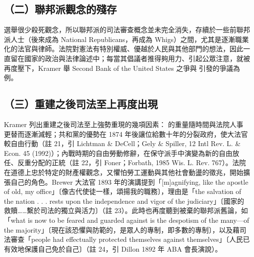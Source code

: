 \subsection{（二）聯邦派觀念的殘存}

選舉很少殺死觀念，所以聯邦派的司法審查概念並未完全消失，存續於一些前聯邦派人士（後來成為 National Republicans，再成為 Whigs）之間，尤其是逐漸職業化的法官與律師。法院對憲法有特別權威、優越於人民與其他部門的想法，因此一直留在國家的政治與法律論述中；每當其倡議者推得夠用力、引起公眾注意，就被再度壓下，Kramer 舉 Second Bank of the United States 之爭與  引發的爭議為例。

\subsection{（三）重建之後司法至上再度出現}

Kramer 列出重建之後司法至上強勢重現的幾項因素： 的重量隨時間與法院人事更替而逐漸減輕；共和黨的優勢在 1874 年後讓位給數十年的分裂政府，使大法官較自由行動（註 21，引 Lichtman \& DeCell；Gely \& Spiller, 12 Int\textquotesingle l Rev. L. \& Econ. 45 (1992)）；內戰時期的自由勞動修辭，在保守派手中演變為新的自由放任、反重分配的正統（註 22，引 Foner；Forbath, 1985 Wis. L. Rev. 767）。法院在道德上忠於特定的財產權觀念，又懼怕勞工運動與其他社會動盪的徵兆，開始擴張自己的角色。Brewer 大法官 1893 年的演講提到「{[}m{]}agnifying, like the apostle of old, my office」〔像古代使徒一樣，頌揚我的職務〕，理由是「the salvation of the nation . . . rests upon the independence and vigor of the judiciary」〔國家的救贖\ldots\ldots 繫於司法的獨立與活力〕（註 23）。此時也再度聽到被棄的聯邦派舊論，如「what is now to be feared and guarded against is the despotism of the many---of the majority」〔現在該恐懼與防範的，是眾人的專制，即多數的專制〕，以及藉司法審查「people had effectually protected themselves against themselves」〔人民已有效地保護自己免於自己〕（註 24，引 Dillon 1892 年 ABA 會長演說）。

